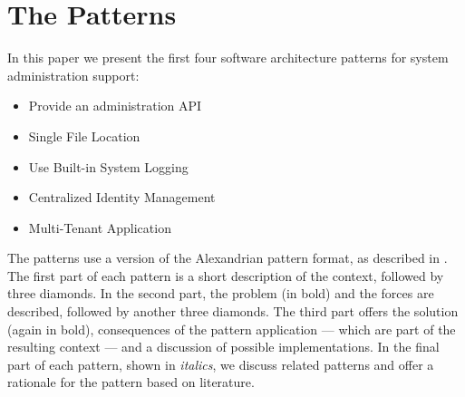 \section{The Patterns}

In this paper we present the first four software architecture patterns for system administration support: 
\begin{itemize} 
	\item {\sc Provide an administration API}
	\item {\sc Single File Location}
	\item {\sc Use Built-in System Logging}
	\item {\sc Centralized Identity Management}
	\item {\sc Multi-Tenant Application}
\end{itemize}

The patterns use a version of the Alexandrian pattern format, as described in \cite{alexander1977}. The first part of each pattern is a short description of the context, followed by three diamonds. In the second part, the problem (in bold) and the forces are described, followed by another three diamonds. The third part offers the solution (again in bold), consequences of the pattern application --- which are part of the resulting context --- and a discussion of possible implementations. In the final part of each pattern, shown in \textit{italics}, we discuss related patterns and offer a rationale for the pattern based on literature.